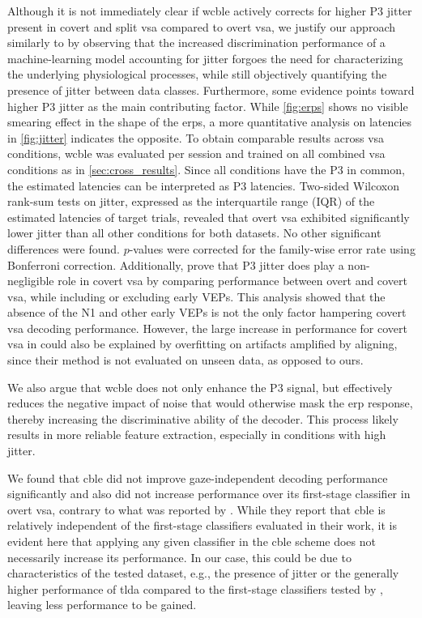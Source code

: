 Although it is not immediately clear if \ac{wcble} actively corrects for higher P3 jitter
present in covert and split \ac{vsa} compared to overt \ac{vsa},
we justify our approach similarly to \cite{Hardiansyah2020} by
observing that the increased discrimination performance of a machine-learning
model accounting for jitter forgoes the need for characterizing the underlying
physiological processes, while still objectively quantifying the presence of
jitter between data classes.
Furthermore, some evidence points toward higher P3 jitter as the main
contributing factor.
While \autoref{fig:erps} shows no visible smearing effect in
the shape of the \acp{erp}, a more quantitative analysis on latencies in
\autoref{fig:jitter} indicates the opposite.
To obtain comparable results across \ac{vsa} conditions, \ac{wcble} was
evaluated per session and trained on all combined \ac{vsa} conditions as in
\cref{sec:cross_results}.
Since all conditions have the P3 in common, the estimated latencies can be
interpreted as P3 latencies.
Two-sided Wilcoxon rank-sum tests on jitter, expressed as the interquartile
range (IQR) of the estimated latencies of target trials, revealed that overt
\ac{vsa} exhibited significantly lower jitter than all other conditions for both datasets.
No other significant differences were found.
$p$-values were corrected for the family-wise error rate using Bonferroni
correction.
Additionally, \textcite{Arico2014} prove that P3 jitter does play a
non-negligible role in covert \ac{vsa} by comparing performance between
overt and covert \ac{vsa}, while including or excluding early VEPs.
This analysis showed that the absence of the N1 and other early VEPs is not the
only factor hampering covert \ac{vsa} decoding performance.
However, the large increase in performance for covert \ac{vsa} in \cite{Arico2014} could also
be explained by overfitting on artifacts amplified by aligning, since their
method is not evaluated on unseen data, as opposed to ours.

We also argue that \ac{wcble} does not only enhance the P3 signal, but effectively reduces the
negative impact of noise that would otherwise mask the \ac{erp} response, thereby increasing the
discriminative ability of the decoder.
This process likely results in more reliable feature extraction, especially in conditions
with high jitter.

We found that \ac{cble} did not improve gaze-independent decoding performance
significantly and also did not increase performance over its first-stage
classifier in overt \ac{vsa}, contrary to what was reported by \cite{Mowla2017}.
While they report that \ac{cble} is relatively independent of the
first-stage classifiers evaluated in their work, it is evident here that
applying any given classifier in the \ac{cble} scheme does not necessarily increase
its performance.
In our case, this could be due to characteristics of the tested dataset, e.g.,
the presence of jitter or the generally higher performance of \ac{tlda} compared to the
first-stage classifiers tested by \cite{Mowla2017}, leaving less
performance to be gained.


